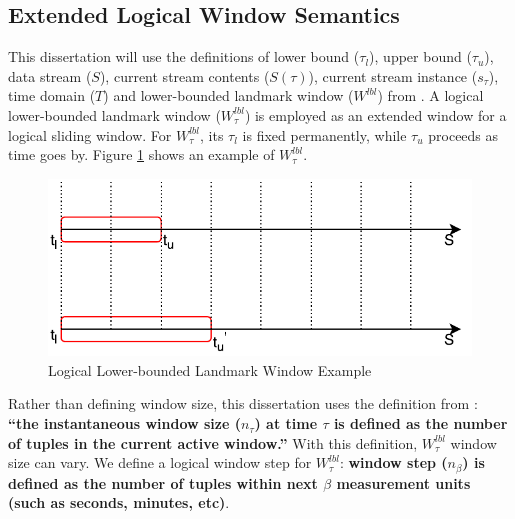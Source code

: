 \subsection{Extended Logical Window Semantics}
This dissertation will use the definitions of lower bound ($\tau_{l}$), upper bound ($\tau_{u}$), data stream ($S$), current stream contents ($S(\tau)$), current stream instance ($s_{\tau}$), time domain ($T$) and lower-bounded landmark window ($W^{lbl}$) from \cite{patroumpas2006window}.
A logical lower-bounded landmark window ($W^{lbl}_{\tau}$) is employed as an extended window for a logical sliding window.
For $W^{lbl}_{\tau}$, its $\tau_{l}$ is fixed permanently, while $\tau_{u}$ proceeds as time goes by. 
Figure \ref{fig:3-lw} shows an example of $W^{lbl}_{\tau}$. 

\begin{figure}[!htbp]
	\centering
    \includegraphics[width=5in]{img/3-lw.pdf}
    \caption{Logical Lower-bounded Landmark Window Example}
    \label{fig:3-lw}
\end{figure}

Rather than defining window size, this dissertation uses the definition from \cite{tangwongsan2015general}:
\textbf{``the instantaneous window size ($n_{\tau}$) at time $\tau$ is defined as the number of tuples in the current active window.''}
With this definition, $W^{lbl}_{\tau}$ window size can vary. 
We define a logical window step for $W^{lbl}_{\tau}$: 
\textbf{window step ($n_{\beta}$) is defined as the number of tuples within next $\beta$ measurement units  \cite{patroumpas2006window} (such as seconds, minutes, etc)}. 

